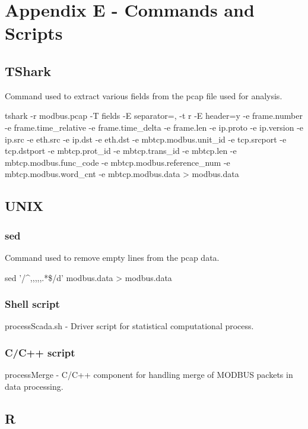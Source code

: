 \documentclass[12pt,]{article}
\begin{document}
\section*{Appendix E - Commands and
Scripts}\label{appendix-e---commands-and-scripts}

\subsection{TShark}\label{tshark}

Command used to extract various fields from the pcap file used for
analysis.

tshark -r modbus.pcap -T fields -E separator=, -t r -E header=y -e
frame.number -e frame.time\_relative -e frame.time\_delta -e frame.len
-e ip.proto -e ip.version -e ip.src -e eth.src -e ip.dst -e eth.dst -e
mbtcp.modbus.unit\_id -e tcp.srcport -e tcp.dstport -e mbtcp.prot\_id -e
mbtcp.trans\_id -e mbtcp.len -e mbtcp.modbus.func\_code -e
mbtcp.modbus.reference\_num -e mbtcp.modbus.word\_cnt -e
mbtcp.modbus.data \textgreater{} modbus.data

\subsection{UNIX}\label{unix}

\subsubsection{sed}\label{sed}

Command used to remove empty lines from the pcap data.

sed '/\^{},,,,,.*\$/d' modbus.data \textgreater{} modbus.data

\subsubsection{Shell script}\label{shell-script}

processScada.sh - Driver script for statistical computational process.

\subsubsection{C/C++ script}\label{cc-script}

processMerge - C/C++ component for handling merge of MODBUS packets in
data processing.

\subsection{R}\label{r}
\end{document}

